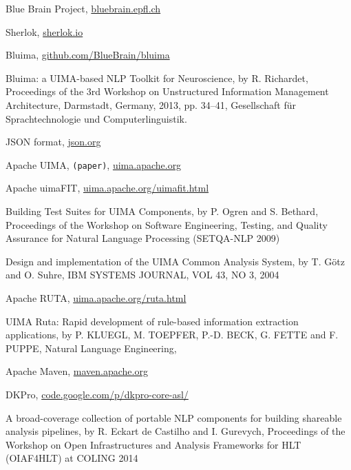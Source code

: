 \documentclass{article}
\newcommand{\TODO}[1]{\texttt{\textcolor{YellowOrange}{(#1)}}} %
\begin{document}
\begin{thebibliography}{99}

    Blue Brain Project,
    \href{http://bluebrain.epfl.ch/}{bluebrain.epfl.ch}

    Sherlok,
    \href{http://sherlok.io}{sherlok.io}

    Bluima,
    \href{https://github.com/BlueBrain/bluima}{github.com/BlueBrain/bluima}

    Bluima: a UIMA-based NLP Toolkit for Neuroscience,
    by R. Richardet,
    Proceedings of the 3rd Workshop on Unstructured Information Management Architecture, Darmstadt,
    Germany, 2013, pp. 34–41, Gesellschaft für Sprachtechnologie und Computerlinguistik.

    JSON format,
    \href{http://json.org/}{json.org}

    Apache UIMA,
	\TODO{paper},
    \href{https://uima.apache.org/}{uima.apache.org}

    Apache uimaFIT,
    \href{https://uima.apache.org/uimafit.html}{uima.apache.org/uimafit.html}

    Building Test Suites for UIMA Components,
    by P. Ogren and S. Bethard,
    Proceedings of the Workshop on Software Engineering, Testing, and Quality Assurance for Natural
    Language Processing (SETQA-NLP 2009)

    Design and implementation of the UIMA Common Analysis System,
    by T. Götz and O. Suhre,
    IBM SYSTEMS JOURNAL, VOL 43, NO 3, 2004

    Apache RUTA,
    \href{https://uima.apache.org/ruta.html}{uima.apache.org/ruta.html}

    UIMA Ruta: Rapid development of rule-based information extraction applications,
    by P. KLUEGL, M. TOEPFER, P.-D. BECK, G. FETTE and F. PUPPE,
    Natural Language Engineering,

    Apache Maven,
    \href{https://maven.apache.org/}{maven.apache.org}

    DKPro,
    \href{https://code.google.com/p/dkpro-core-asl/}{code.google.com/p/dkpro-core-asl/}

    A broad-coverage collection of portable NLP components for building shareable analysis
    pipelines,
    by R. Eckart de Castilho and I. Gurevych,
    Proceedings of the Workshop on Open Infrastructures and Analysis Frameworks for HLT (OIAF4HLT)
    at COLING 2014


\end{thebibliography}
\end{document}
